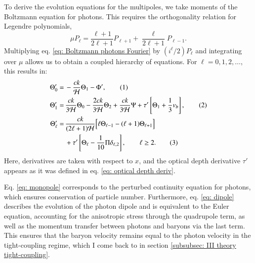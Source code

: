 \documentclass{aa}
\newcommand\numberthis{\addtocounter{equation}{1}\tag{\theequation}}
\numberwithin{equation}{section}
\numberwithin{table}{section}
\numberwithin{figure}{section}
\begin{document}
To derive the evolution equations for the multipoles, we take moments of the Boltzmann equation for photons. This requires the orthogonality relation for Legendre polynomials,
\begin{equation}
  \mu P_\ell = \frac{\ell+1}{2\ell+1} P_{\ell+1} + \frac{\ell}{2\ell+1} P_{\ell-1}. 
\end{equation}
Multiplying eq. \eqref{eq: Boltzmann photons Fourier} by $(i^\ell/2) P_\ell$ and integrating over $\mu$ allows us to obtain a coupled hierarchy of equations. For $\ell = 0,1,2,\ldots$, this results in:
\begin{align*} 
  \Theta_0' =\, &-\frac{ck}{\mathcal{H}} \Theta_1 - \Phi', \numberthis \label{eq: monopole} \\ 
  \Theta_1' =\, &\frac{ck}{3\mathcal{H}} \Theta_0 - \frac{2ck}{3\mathcal{H}} \Theta_2 + \frac{ck}{3\mathcal{H}} \Psi + \tau' \left[ \Theta_1 + \frac{1}{3} v_b \right], \numberthis \label{eq: dipole} \\
  \Theta_\ell' =\, &\frac{c k}{(2\ell+1) \mathcal{H}} \Big[ \ell \Theta_{\ell-1} - (\ell+1) \Theta_{\ell+1} \Big] \\
  &+ \tau' \left[ \Theta_\ell - \frac{1}{10} \Pi \delta_{\ell,2} \right], \qquad \ell \geq 2. \numberthis 
\end{align*}
Here, derivatives are taken with respect to $x$, and the optical depth derivative $\tau'$ appears as it was defined in eq. \eqref{eq: optical depth deriv}.

Eq. \eqref{eq: monopole} corresponds to the perturbed continuity equation for photons, which ensures conservation of particle number. Furthermore, eq. \eqref{eq: dipole} describes the evolution of the photon dipole and is equivalent to the Euler equation, accounting for the anisotropic stress through the quadrupole term, as well as the momentum transfer between photons and baryons via the last term. 
This ensures that the baryon velocity remains equal to the photon velocity in the tight-coupling regime, which I come back to in section \ref{subsubsec: III theory tight-coupling}.
\end{document}
